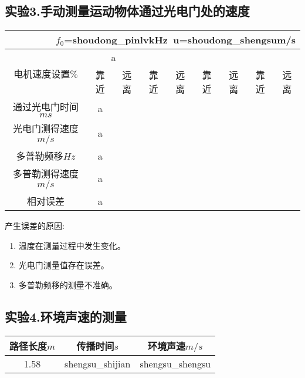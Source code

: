 \subsection*{实验3.手动测量运动物体通过光电门处的速度}
\begin{center}
\begin{tabular}{|c|c|c|c|c|c|c|c|c|}
	\multicolumn{9}{r}{$f_0$={{shoudong_pinlv}}kHz\ u={{shoudong_shengsu}}m/s}
	\\\hline
	\multirow{2}{*}{电机速度设置\(\%\)}
	{%
		&\multicolumn{2}{|c|}{ {{ a }} } 
	{%
		\\\cline{2-9}
	&靠近&远离&靠近&远离&靠近&远离&靠近&远离
	\\\hline
	通过光电门时间\(ms\)
	{%
		& {{ a }} 
	{%
	\\\hline
	光电门测得速度\(m/s\)
	{%
		& {{ a }} 
	{%
	\\\hline
	多普勒频移\(Hz\)
	{%
		& {{ a }} 
	{%
	\\\hline
	多普勒测得速度\(m/s\)
	{%
		& {{ a }} 
	{%
	\\\hline
	相对误差
	{%
		& {{ a }} 
	{%
	\\\hline
\end{tabular}
\end{center}
产生误差的原因:
\begin{enumerate}
	\itemsep=-5pt
		\item 温度在测量过程中发生变化。
		\item 光电门测量值存在误差。
		\item 多普勒频移的测量不准确。
\end{enumerate}


\subsection*{实验4.环境声速的测量}
\begin{center}
	\begin{tabular}{|c|c|c|}
	\hline
		路径长度\(m\)&传播时间\(s\)&环境声速\(m/s\)
	\\\hline
	1.58&{{shengsu_shijian}}&{{shengsu_shengsu}}
	\\\hline
	\end{tabular}
\end{center}